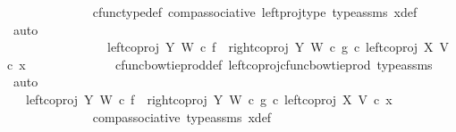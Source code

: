 \begin{isabellebody}
\ \ \ \ \ \ \ \ \ \ \ \ \isamarkupfalse%
\ cfunc{\isacharunderscore}{\kern0pt}type{\isacharunderscore}{\kern0pt}def\ comp{\isacharunderscore}{\kern0pt}associative\ left{\isacharunderscore}{\kern0pt}proj{\isacharunderscore}{\kern0pt}type\ type{\isacharunderscore}{\kern0pt}assms{\isacharparenleft}{\kern0pt}{}{\isacharparenright}{\kern0pt}\ x{}{\isacharunderscore}{\kern0pt}def\ \isamarkupfalse%
\ auto\ \ \ \ \ \ \ \ \ \ \ \ \isanewline
\ \ \ \ \ \ \ \ \ \ \isamarkupfalse%
\ \isamarkupfalse%
\ {\isachardoublequoteopen}{\isachardot}{\kern0pt}{\isachardot}{\kern0pt}{\isachardot}{\kern0pt}\ {\isacharequal}{\kern0pt}\ \isanewline
\ \ \ \ \ \ \ \ \ \ \ \ \ \ \ \ {\isacharparenleft}{\kern0pt}{\isacharparenleft}{\kern0pt}{\isacharparenleft}{\kern0pt}left{\isacharunderscore}{\kern0pt}coproj\ Y\ W\ {\isasymcirc}\isactrlsub c\ f{\isacharparenright}{\kern0pt}\ {\isasymamalg}\ {\isacharparenleft}{\kern0pt}right{\isacharunderscore}{\kern0pt}coproj\ Y\ W\ {\isasymcirc}\isactrlsub c\ g{\isacharparenright}{\kern0pt}{\isacharparenright}{\kern0pt}\ {\isasymcirc}\isactrlsub c\ left{\isacharunderscore}{\kern0pt}coproj\ X\ V{\isacharparenright}{\kern0pt}\ {\isasymcirc}\isactrlsub c\ x{}{\isachardoublequoteclose}\isanewline
\ \ \ \ \ \ \ \ \ \ \ \ \isamarkupfalse%
\ cfunc{\isacharunderscore}{\kern0pt}bowtie{\isacharunderscore}{\kern0pt}prod{\isacharunderscore}{\kern0pt}def{}\ left{\isacharunderscore}{\kern0pt}coproj{\isacharunderscore}{\kern0pt}cfunc{\isacharunderscore}{\kern0pt}bowtie{\isacharunderscore}{\kern0pt}prod\ type{\isacharunderscore}{\kern0pt}assms\ \isamarkupfalse%
\ auto\isanewline
\ \ \ \ \ \ \ \ \ \ \isamarkupfalse%
\ \isamarkupfalse%
\ {\isachardoublequoteopen}{\isachardot}{\kern0pt}{\isachardot}{\kern0pt}{\isachardot}{\kern0pt}\ {\isacharequal}{\kern0pt}\ {\isacharparenleft}{\kern0pt}{\isacharparenleft}{\kern0pt}left{\isacharunderscore}{\kern0pt}coproj\ Y\ W\ {\isasymcirc}\isactrlsub c\ f{\isacharparenright}{\kern0pt}\ {\isasymamalg}\ {\isacharparenleft}{\kern0pt}right{\isacharunderscore}{\kern0pt}coproj\ Y\ W\ {\isasymcirc}\isactrlsub c\ g{\isacharparenright}{\kern0pt}{\isacharparenright}{\kern0pt}\ {\isasymcirc}\isactrlsub c\ left{\isacharunderscore}{\kern0pt}coproj\ X\ V\ {\isasymcirc}\isactrlsub c\ x{}{\isachardoublequoteclose}\isanewline
\ \ \ \ \ \ \ \ \ \ \ \ \isamarkupfalse%
\ comp{\isacharunderscore}{\kern0pt}associative{}\ type{\isacharunderscore}{\kern0pt}assms\ x{}{\isacharunderscore}{\kern0pt}def\ \isamarkupfalse%

\end{isabellebody}
